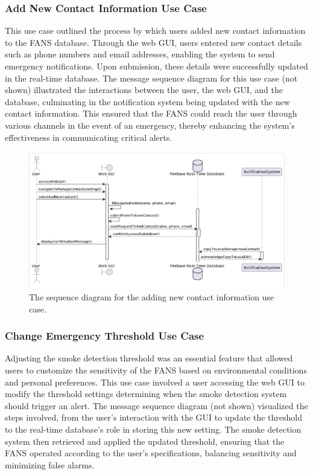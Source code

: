 \subsubsection{Add New Contact Information Use Case}

This use case outlined the process by which users added new contact information to the FANS database. Through the web
GUI, users entered new contact details such as phone numbers and email addresses, enabling the system to send emergency
notifications. Upon submission, these details were successfully updated in the real-time database. The message sequence
diagram for this use case (not shown) illustrated the interactions between the user, the web GUI, and the database,
culminating in the notification system being updated with the new contact information. This ensured that the FANS could
reach the user through various channels in the event of an emergency, thereby enhancing the system’s effectiveness in
communicating critical alerts.

\begin{figure}[H]
    \centering
    \includegraphics[width=\imagewidth]{../assets/sequence/AddingNewContactInformationSequenceDiagram.png}
    \caption{The sequence diagram for the adding new contact information use case.}
\end{figure}

\subsubsection{Change Emergency Threshold Use Case}

Adjusting the smoke detection threshold was an essential feature that allowed users to customize the sensitivity of the
FANS based on environmental conditions and personal preferences. This use case involved a user accessing the web GUI to
modify the threshold settings determining when the smoke detection system should trigger an alert. The message sequence
diagram (not shown) visualized the steps involved, from the user’s interaction with the GUI to update the threshold to
the real-time database’s role in storing this new setting. The smoke detection system then retrieved and applied the
updated threshold, ensuring that the FANS operated according to the user’s specifications, balancing sensitivity and
minimizing false alarms.

